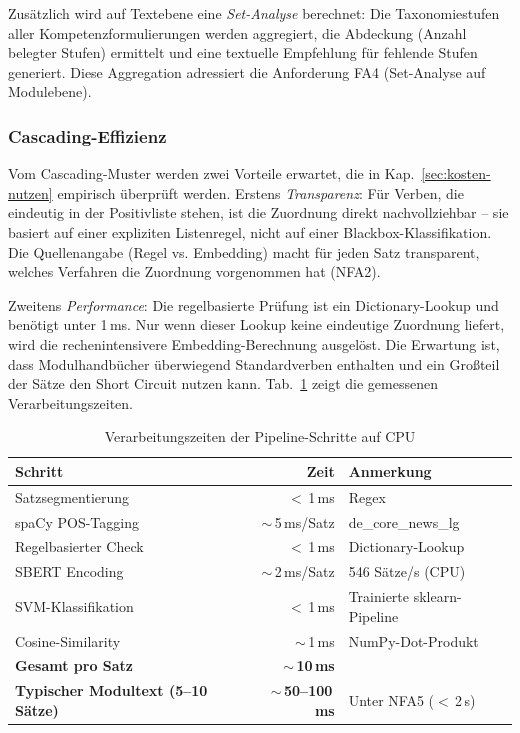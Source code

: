 Zusätzlich wird auf Textebene eine \emph{Set-Analyse} berechnet: Die Taxonomiestufen aller Kompetenzformulierungen werden aggregiert, die Abdeckung (Anzahl belegter Stufen) ermittelt und eine textuelle Empfehlung für fehlende Stufen generiert.
Diese Aggregation adressiert die Anforderung FA4 (Set-Analyse auf Modulebene).

\subsubsection{Cascading-Effizienz}\label{sec:cascading-effizienz}

Vom Cascading-Muster werden zwei Vorteile erwartet, die in Kap.~\ref{sec:kosten-nutzen} empirisch überprüft werden.
Erstens \emph{Transparenz}: Für Verben, die eindeutig in der Positivliste stehen, ist die Zuordnung direkt nachvollziehbar -- sie basiert auf einer expliziten Listenregel, nicht auf einer Blackbox-Klassifikation.
Die Quellenangabe (Regel vs. Embedding) macht für jeden Satz transparent, welches Verfahren die Zuordnung vorgenommen hat (NFA2).

Zweitens \emph{Performance}: Die regelbasierte Prüfung ist ein Dictionary-Lookup und benötigt unter 1\,ms.
Nur wenn dieser Lookup keine eindeutige Zuordnung liefert, wird die rechenintensivere Embedding-Berechnung ausgelöst.
Die Erwartung ist, dass Modulhandbücher überwiegend Standardverben enthalten und ein Großteil der Sätze den Short Circuit nutzen kann.
Tab.~\ref{tab:performance} zeigt die gemessenen Verarbeitungszeiten.

\begin{table}[H]
\caption{Verarbeitungszeiten der Pipeline-Schritte auf CPU\label{tab:performance}}
\centering
\small
\begin{tabular}{lrl}
\hline
\textbf{Schritt} & \textbf{Zeit} & \textbf{Anmerkung} \\
\hline
Satzsegmentierung & $<$\,1\,ms & Regex \\
spaCy POS-Tagging & $\sim$\,5\,ms/Satz & de\_core\_news\_lg \\
Regelbasierter Check & $<$\,1\,ms & Dictionary-Lookup \\
SBERT Encoding & $\sim$\,2\,ms/Satz & 546 Sätze/s (CPU) \\
SVM-Klassifikation & $<$\,1\,ms & Trainierte sklearn-Pipeline \\
Cosine-Similarity & $\sim$\,1\,ms & NumPy-Dot-Produkt \\
\hline
\textbf{Gesamt pro Satz} & $\sim$\,\textbf{10\,ms} & \\
\textbf{Typischer Modultext (5--10 Sätze)} & $\sim$\,\textbf{50--100\,ms} & Unter NFA5 ($<$\,2\,s) \\
\hline
\end{tabular}
\end{table}


